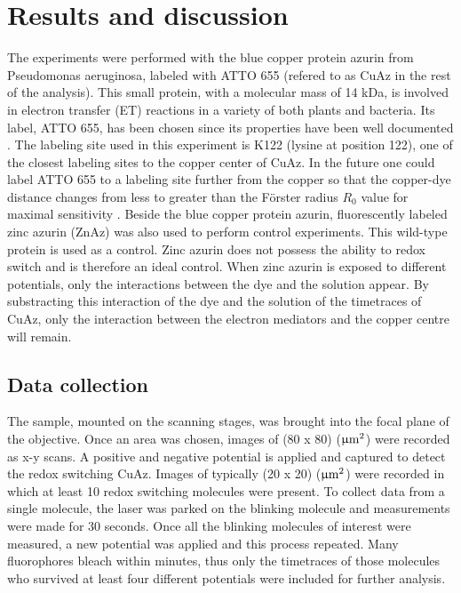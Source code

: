 \documentclass[twoside,single]{lion-msc}
\begin{document}
\chapter{Results and discussion}

The experiments were performed with the blue copper protein azurin from Pseudomonas aeruginosa, labeled with ATTO 655 (refered to as CuAz in the rest of the analysis). This small protein, with a molecular mass of 14 kDa, is involved in electron transfer (ET) reactions in a variety of both plants and bacteria. Its label, ATTO 655, has been chosen since its properties have been well documented \cite{pvd_11}. The labeling site used in this experiment is K122 (lysine at position 122), one of the closest labeling sites to the copper center of CuAz. In the future one could label ATTO 655 to a labeling site further from the copper so that the copper-dye distance changes from less to greater than the F\"{o}rster radius $R_{0}$ value for maximal sensitivity \cite{Roy2008}. 
Beside the blue copper protein azurin, fluorescently labeled zinc azurin (ZnAz) was also used to perform control experiments. This wild-type protein is used as a control. Zinc azurin does not possess the ability to redox switch and is therefore an ideal control. When zinc azurin is exposed to different potentials, only the interactions between the dye and the solution appear. By substracting this interaction of the dye and the solution of the timetraces of CuAz, only the interaction between the electron mediators and the copper centre will remain. 

\section*{Data collection} \label{data_coll}
The sample, mounted on the scanning stages, was brought into the focal plane of the objective. Once an area was chosen, images of (80 x 80) ($\upmu \textup{m}^{2}$) were recorded as x-y scans. A positive and negative potential is applied and captured to detect the redox switching CuAz. Images of typically (20 x 20) ($\upmu \textup{m}^{2}$) were recorded in which at least 10 redox switching molecules were present. To collect data from a single molecule, the laser was parked on the blinking molecule and measurements were made for 30 seconds. Once all the blinking molecules of interest were measured, a new potential was applied and this process repeated. Many fluorophores bleach within minutes, thus only the timetraces of those molecules who survived at least four different potentials were included for further analysis. 
\end{document}
